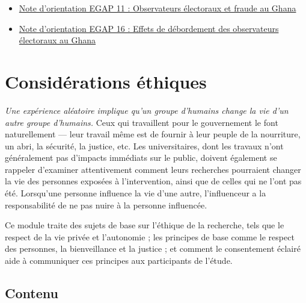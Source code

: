 \documentclass[
  12pt,
]{book}
\begin{document}
\begin{itemize}
\item
  \href{https://egap.org/resource/brief-11-election-observers-and-fraud-in-ghana/}{Note d'orientation EGAP 11 : Observateurs électoraux et fraude au Ghana}
\item
  \href{https://egap.org/resource/brief-16-spillover-effects-of-observers-in-ghana/}{Note d'orientation EGAP 16 : Effets de débordement des observateurs électoraux au Ghana}
\end{itemize}

\hypertarget{considuxe9rations-uxe9thiques}{%
\chapter{Considérations éthiques}\label{considuxe9rations-uxe9thiques}}

\emph{Une expérience aléatoire implique qu'un groupe d'humains change la vie d'un autre groupe d'humains.} Ceux qui travaillent pour le gouvernement le font naturellement --- leur travail même est de fournir à leur peuple de la nourriture, un abri, la sécurité, la justice, etc.
Les universitaires, dont les travaux n'ont généralement pas d'impacts immédiats sur le public, doivent également se rappeler d'examiner attentivement comment leurs recherches pourraient changer la vie des personnes exposées à l'intervention, ainsi que de celles qui ne l'ont pas été. Lorsqu'une personne influence la vie d'une autre, l'influenceur a la responsabilité de ne pas nuire à la personne influencée.

Ce module traite des sujets de base sur l'éthique de la recherche, tels que le respect de la vie privée et l'autonomie ; les principes de base comme le respect des personnes, la bienveillance et la justice ; et comment le consentement éclairé aide à communiquer ces principes aux participants de l'étude.

\hypertarget{contenu-8}{%
\section{Contenu}\label{contenu-8}}
\end{document}
